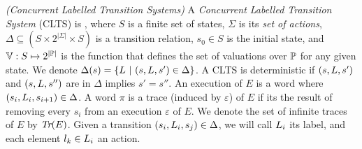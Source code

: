 \begin{definition}
	 \emph{(Concurrent Labelled Transition Systems)} 
	A \emph{Concurrent Labelled Transition System} (CLTS) is \cltsDef, where $S$ is a finite set of states, $\Sigma$ is its {\em set of actions}, $\Delta \subseteq (S \times 2^{|\Sigma|} \times S)$ is a transition relation, $s_0 \in S$ is the initial state, and $\mathbb{V} : S \mapsto  2^{|\mathbb{P}|}$ is the function that defines the set of valuations over $\mathbb{P}$ for any given state.  We denote $\Delta(s)=\{L~|~(s,L,s') \in \Delta\}$. 
	A CLTS is deterministic if $(s,L,s')$ and $(s,L,s'')$ are in $\Delta$ implies $s'=s''$.
	An execution of $E$ is a word \executionDef where $(s_i, L_i, s_{i+1}) \in \Delta$. 
	A word $\pi$ is a trace (induced by $\varepsilon$) of $E$ if its the result of removing every $s_i$ from an execution $\varepsilon$ of $E$. 
	We denote the set of infinite traces of $E$ by $\emph{Tr}(E)$. Given a transition $(s_i, L_i, s_j) \in \Delta$, we will call $L_i$ its label, and each element $l_k \in L_i$ an action.
\end{definition}